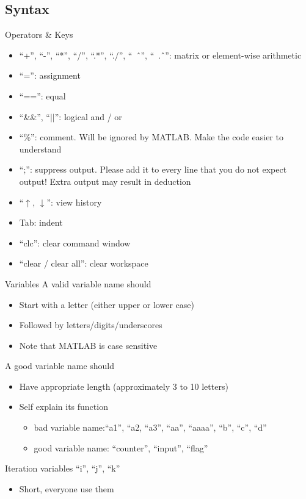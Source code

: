 \subsection{Syntax}
\begin{frame}{Operators \& Keys}
\begin{itemize}
\item ``+'', ``-'', ``*'', ``/'', ``.*'', ``./'', ``\ \^\ '', ``\ .\^\ '': matrix or element-wise arithmetic
\item ``='': assignment
\item ``=='': equal
\item ``\&\&'', ``$||$'': logical and / or
\item ``\%'': comment. Will be ignored by MATLAB. Make the code easier to understand
\item ``;'': suppress output. Please add it to every line that you do not expect output! Extra output may result in deduction
\item ``$\uparrow$, $\downarrow$'': view history
\item Tab: indent
\item ``clc'': clear command window
\item ``clear / clear all'': clear workspace
\end{itemize}
\end{frame}

\begin{frame}{Variables}
A valid variable name should
\begin{itemize}
\item Start with a letter (either upper or lower case)
\item Followed by letters/digits/underscores
\item Note that MATLAB is case sensitive
\end{itemize}
A good variable name should\footnotemark
\begin{itemize}
\item Have appropriate length (approximately 3 to 10 letters)
\item Self explain its function
\begin{itemize}
\item bad variable name:``a1'', ``a2, ``a3'', ``aa'', ``aaaa'', ``b'', ``c'', ``d''
\item good variable name: ``counter'', ``input'', ``flag''
\end{itemize}
\end{itemize}
Iteration variables ``i'', ``j'', ``k''
\begin{itemize}
\item Short, everyone use them
\end{itemize}
\end{frame}

